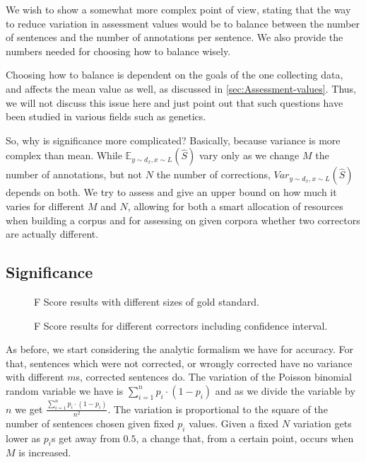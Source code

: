 \documentclass[english]{article}
\begin{document}
{We wish to show a somewhat more complex point of view, stating that the way to reduce variation in assessment values would be to balance between the number of sentences and the number of annotations per sentence. We also provide the numbers needed for choosing how to balance wisely. 

Choosing how to balance is dependent on the goals of the one collecting data, and affects the mean value as well, as discussed in \ref{sec:Assessment-values}. Thus, we will not discuss this issue here and just point out that such questions have been studied in various fields such as genetics\cite{ionita2010optimal}.

So, why is significance more complicated? Basically, because variance is more complex than mean. While $\mathbb{E}_{y\sim d_x, x\sim L}\left(\hat{S}\right)$ vary only as we change $M$
the number of annotations, but not $N$ the number of corrections,
$Var_{y\sim d_x, x\sim L}(\hat{S})$ depends on both. We try to assess and give an upper
bound on how much it varies for different $M$ and $N$, allowing
for both a smart allocation of resources when building a corpus and
for assessing on given corpora whether two correctors are actually different.

\subsection{Significance}

\begin{figure}
	\caption{F Score results with different sizes of gold standard.}
	\label{fig:F_Ms}
\end{figure}
\begin{figure}
	\caption{F Score results for different correctors including confidence interval.}
	\label{fig:F_correctors}
\end{figure}


As before, we start considering the analytic formalism we have for accuracy. For that, sentences which were not corrected, or wrongly corrected have no variance with different $m$s, corrected sentences do. The variation of the Poisson binomial random variable we have is $\sum_{i=1}^{n}p_i\cdot\left(1-p_i\right)$ and as we divide the variable by $n$ we get $\frac{\sum_{i=1}^{n}p_i\cdot\left(1-p_i\right)}{n^2}$. 
The variation is proportional to the square of the number of sentences chosen given fixed $p_i$ values. Given a fixed $N$ variation gets lower as $p_i$s get away from $0.5$, a change that, from a certain point, occurs when $M$ is increased.

}
\end{document}
